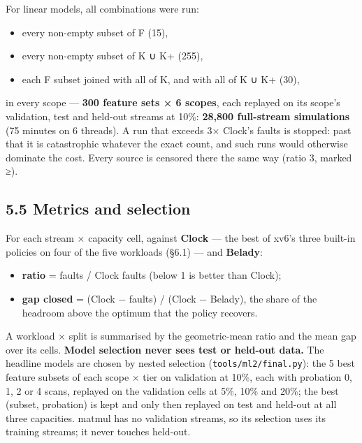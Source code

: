 \documentclass[10pt,a4paper]{article}
\newcommand{\code}[1]{\texttt{#1}}
\begin{document}
For linear models, all combinations were run:

\begin{itemize}
\item every non-empty subset of F (15),
\item every non-empty subset of K ∪ K+ (255),
\item each F subset joined with all of K, and with all of K ∪ K+ (30),
\end{itemize}

in every scope — \textbf{300 feature sets × 6 scopes}, each replayed on its scope's validation, test and held-out streams at 10\%: \textbf{28,800 full-stream simulations} (75 minutes on 6 threads). A run that exceeds 3× Clock's faults is stopped: past that it is catastrophic whatever the exact count, and such runs would otherwise dominate the cost. Every source is censored there the same way (ratio 3, marked ≥).

\subsection*{5.5 Metrics and selection}

For each stream × capacity cell, against \textbf{Clock} — the best of xv6's three built-in policies on four of the five workloads (§6.1) — and \textbf{Belady}:

\begin{itemize}
\item \textbf{ratio} = faults / Clock faults (below 1 is better than Clock);
\item \textbf{gap closed} = (Clock − faults) / (Clock − Belady), the share of the headroom above the optimum that the policy recovers.
\end{itemize}

A workload × split is summarised by the geometric-mean ratio and the mean gap over its cells. \textbf{Model selection never sees test or held-out data.} The headline models are chosen by nested selection (\code{tools/\allowbreak{}ml2/\allowbreak{}final.\allowbreak{}py}): the 5 best feature subsets of each scope × tier on validation at 10\%, each with probation 0, 1, 2 or 4 scans, replayed on the validation cells at 5\%, 10\% and 20\%; the best (subset, probation) is kept and only then replayed on test and held-out at all three capacities. matmul has no validation streams, so its selection uses its training streams; it never touches held-out.
\end{document}
